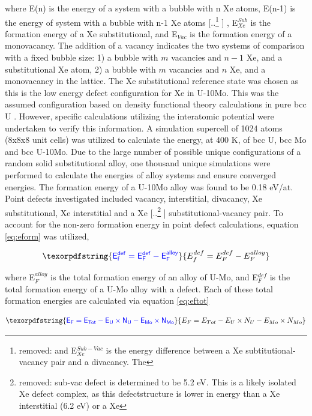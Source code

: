 \documentclass[review]{elsarticle}
\providecommand{\DIFaddtex}[1]{{\protect\color{blue} \sf #1}} %
\providecommand{\DIFdeltex}[1]{{\protect\color{red} [..\footnote{removed: #1} ]}} %
\providecommand{\DIFaddbegin}{} %
\providecommand{\DIFaddend}{} %
\providecommand{\DIFdelbegin}{} %
\providecommand{\DIFdelend}{} %
\providecommand{\DIFadd}[1]{\texorpdfstring{\DIFaddtex{#1}}{#1}} %
\providecommand{\DIFdel}[1]{\texorpdfstring{\DIFdeltex{#1}}{}} %
\newcommand{\DIFscaledelfig}{0.5}
\newlength{\DIFdelgraphicswidth} %
\newlength{\DIFdelgraphicsheight} %
\newcommand{\DIFaddincludegraphics}[2][]{{\color{blue}\fbox{\DIFOincludegraphics[#1]{#2}}}} %
\newcommand{\DIFdelincludegraphics}[2][]{%
\sbox{\DIFdelgraphicsbox}{\DIFOincludegraphics[#1]{#2}}%
\settoboxwidth{\DIFdelgraphicswidth}{\DIFdelgraphicsbox} %
\settoboxtotalheight{\DIFdelgraphicsheight}{\DIFdelgraphicsbox} %
\scalebox{\DIFscaledelfig}{%
\parbox[b]{\DIFdelgraphicswidth}{\usebox{\DIFdelgraphicsbox}\\[-\baselineskip] \rule{\DIFdelgraphicswidth}{0em}}\llap{\resizebox{\DIFdelgraphicswidth}{\DIFdelgraphicsheight}{%
\setlength{\unitlength}{\DIFdelgraphicswidth}%
\begin{picture}(1,1)%
\thicklines\linethickness{2pt} %
{\color[rgb]{1,0,0}\put(0,0){\framebox(1,1){}}}%
{\color[rgb]{1,0,0}\put(0,0){\line( 1,1){1}}}%
{\color[rgb]{1,0,0}\put(0,1){\line(1,-1){1}}}%
\end{picture}%
}\hspace*{3pt}}} %
} %
\DeclareRobustCommand{\DIFaddbegin}{\DIFOaddbegin \let\includegraphics\DIFaddincludegraphics} %
\DeclareRobustCommand{\DIFaddend}{\DIFOaddend \let\includegraphics\DIFOincludegraphics} %
\DeclareRobustCommand{\DIFdelbegin}{\DIFOdelbegin \let\includegraphics\DIFdelincludegraphics} %
\DeclareRobustCommand{\DIFdelend}{\DIFOaddend \let\includegraphics\DIFOincludegraphics} %
\begin{document}
where E(n) is the energy of a system with a bubble with n Xe atoms, E(n-1) is the energy of system with a bubble with n-1 Xe atoms\DIFdelbegin \DIFdel{and E$_{Xe}^{Sub-Vac}$ is the energy difference between a Xe subtitutional-vacancy pair and a divacancy. The }\DIFdelend \DIFaddbegin \DIFadd{, E$_{Xe}^{Sub}$ is the formation energy of a Xe substitutional, and E$_{Vac}$ is the formation energy of a monovacancy. The addition of a vacancy indicates the two systems of comparison with a fixed bubble size: 1) a bubble with $m$ vacancies and $n-1$ Xe, and a substitutional Xe atom, 2) a bubble with $m$ vacancies and $n$ Xe, and a monovacancy in the lattice. The Xe substitutional reference state was chosen as this is the low energy defect configuration for Xe in U-10Mo. This was the assumed configuration based on density functional theory calculations in pure bcc U \cite{beelerASTM}. However, specific calculations utilizing the interatomic potential were undertaken to verify this information. A simulation supercell of 1024 atoms (8x8x8 unit cells) was utilized to calculate the energy, at 400 K, of bcc U, bcc Mo and bcc U-10Mo. Due to the large number of possible unique configurations of a random solid substitutional alloy, one thousand unique simulations were performed to calculate the energies of alloy systems and ensure converged energies. The }\DIFaddend formation energy of a \DIFaddbegin \DIFadd{U-10Mo alloy was found to be 0.18 eV/at. Point defects investigated included vacancy, interstitial, divacancy, Xe substitutional, Xe interstitial and a }\DIFaddend Xe \DIFdelbegin \DIFdel{sub-vac defect is determined to be 5.2 eV. This is a likely isolated Xe defect complex, as this defectstructure is lower in energy than a Xe interstitial (6.2 eV) or a Xe }\DIFdelend \DIFaddbegin \DIFadd{substitutional-vacancy pair. To account for the non-zero formation energy in point defect calculations, equation \ref{eq:eform} was utilized, 
}

\begin{equation}
\DIFadd{\label{eq:eform}
E_f^{def}= E_F^{def} - E_F^{alloy} 
}\end{equation}

\DIFadd{where E$_F^{alloy}$ is the total formation energy of an alloy of U-Mo, and E$_F^{def}$ is the total formation energy of a U-Mo alloy with a defect. Each of these total formation energies are calculated via equation \ref{eq:eftot}
}

\begin{equation}
\DIFadd{\label{eq:eftot}
E_F= E_{Tot} - E_U\times N_U - E_{Mo}\times N_{Mo}  
}\end{equation}
\end{document}
